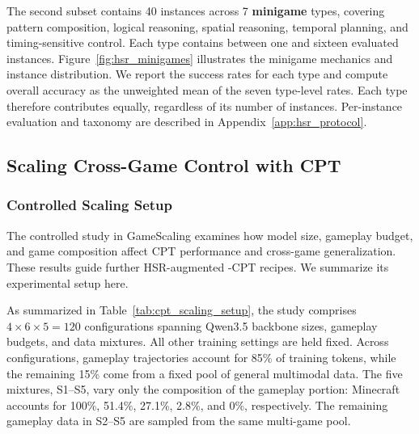 The second subset contains 40 instances across 7 \textbf{minigame} types, covering pattern composition, logical reasoning, spatial reasoning, temporal planning, and timing-sensitive control. Each type contains between one and sixteen evaluated instances. Figure~\ref{fig:hsr_minigames} illustrates the minigame mechanics and instance distribution. We report the success rates for each type and compute overall accuracy as the unweighted mean of the seven type-level rates. Each type therefore contributes equally, regardless of its number of instances. Per-instance evaluation and taxonomy are described in Appendix~\ref{app:hsr_protocol}.


\subsection{Scaling Cross-Game Control with CPT}
\label{sec:exp_cpt_scaling}

\subsubsection{Controlled Scaling Setup}

The controlled study in GameScaling \cite{gamescaling} examines how model size, gameplay budget, and game composition affect CPT performance and cross-game generalization. These results guide further HSR-augmented \ourmodel-CPT recipes. We summarize its experimental setup here.

As summarized in Table~\ref{tab:cpt_scaling_setup}, the study comprises $4\times6\times5=120$ configurations spanning Qwen3.5 backbone sizes, gameplay budgets, and data mixtures. All other training settings are held fixed. Across configurations, gameplay trajectories account for 85\% of training tokens, while the remaining 15\% come from a fixed pool of general multimodal data. The five mixtures, S1--S5, vary only the composition of the gameplay portion: Minecraft accounts for 100\%, 51.4\%, 27.1\%, 2.8\%, and 0\%, respectively. The remaining gameplay data in S2--S5 are sampled from the same multi-game pool.


